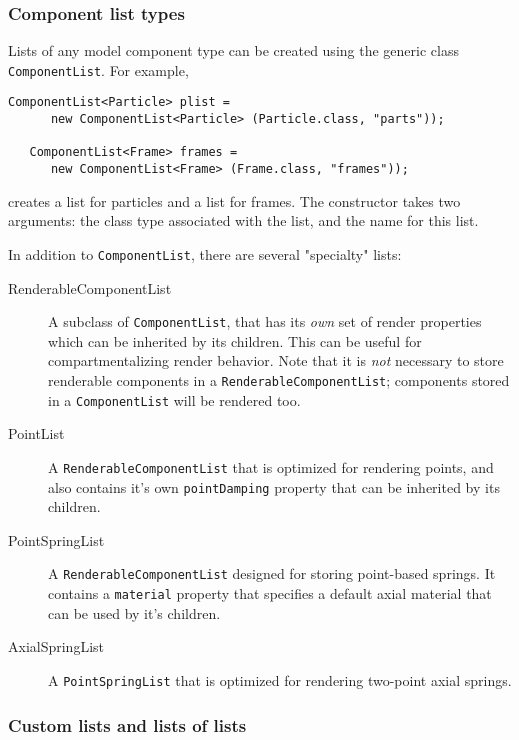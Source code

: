 \documentclass{article}
\begin{document}
\subsubsection*{Component list types}

Lists of any model component type can be created using the
generic class {\tt ComponentList}. For example,
\begin{lstlisting}[]
   ComponentList<Particle> plist = 
      new ComponentList<Particle> (Particle.class, "parts"));

   ComponentList<Frame> frames = 
      new ComponentList<Frame> (Frame.class, "frames"));
\end{lstlisting}
creates a list for particles and a list for frames. The constructor
takes two arguments: the class type associated with the list, and
the name for this list.

In addition to {\tt ComponentList}, there are several "specialty"
lists:

\begin{description}

\item[RenderableComponentList] A subclass of {\tt ComponentList}, that
has its {\it own} set of render properties which can be inherited by
its children. This can be useful for compartmentalizing render
behavior.  Note that it is {\it not} necessary to store renderable
components in a {\tt RenderableComponentList}; components stored in a
{\tt ComponentList} will be rendered too.

\item[PointList] A {\tt RenderableComponentList} that is optimized for
rendering points, and also contains it's own {\tt pointDamping}
property that can be inherited by its children.

\item[PointSpringList] A {\tt RenderableComponentList} designed for
storing point-based springs. It contains a {\tt material} property that
specifies a default axial material that can be used by it's children.

\item[AxialSpringList] A {\tt PointSpringList} that is optimized for
rendering two-point axial springs.

\end{description}

\subsubsection*{Custom lists and lists of lists}
\end{document}
